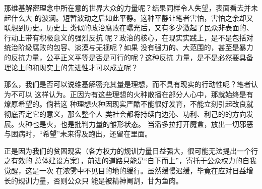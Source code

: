 那维基解密理念中所在意的世界大众的力量呢？结果同样令人失望，表面看去并未起什么大
的波澜。短暂波动之后如此平静。这种平静让笔者害怕，害怕之余却又联想到历史。历史上
类似的政治腐败在曝光后，又有多少激起了民众非表面的、行动上带有积极意义的强烈反抗
呢？政治的核心，在现实实践上，是不是包括对统治阶级腐败的包容、淡漠与无视呢？如果
没有强力的、大范围的，甚至是暴力的反抗力量，公平正义平等是否是可行的呢？这种反抗
力量，是不是必然要具备理论上的和现实上的先进性才可以成立呢？

那么，我们是否可以说维基解密充其量是理想，而不具有现实的行动性呢？笔者认为不可以
这样认为。正因为有这些理想的火种散播在部分人心中，那就始终是有燎原希望的。倘若这
种理想火种因现实严酷不能很好发育，不能立刻引起改良就彻底否定它的意义，那么整个人
类社会都将持续向边沁、功利、利己的的方向发展。火种也是火，也是批判力量的雏形状态。
当潘多拉打开魔盒，放出一切邪恶与困病时，“希望”未来得及跑出，还留在里面。

正是因为我们的贫困现实（各方权力的规训力量日益强大，很可能无法提出一个行之有效的
总体建设方案），前进的道路只能是“自下而上”，寄托于公众权力的自我觉醒，这是一次
在浓雾中不见目的地的缓行。虽然缓慢迟缓，毕竟在应对日益增长的规训力量，否则公众只
能是被精神阉割，甘为鱼肉。


